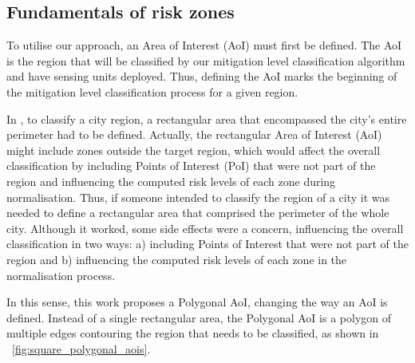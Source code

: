 \begin{refsection}
\section{Fundamentals of risk zones}\label{sec:proposed_approach}


To utilise our approach, an Area of Interest (AoI) must first be defined. The AoI is the region that will be classified by our mitigation level classification algorithm and have sensing units deployed. Thus, defining the AoI marks the beginning of the mitigation level classification process for a given region.

In \cite{riskzones}, to classify a city region, a rectangular area that encompassed the city's entire perimeter had to be defined. Actually, the rectangular Area of Interest (AoI) might include zones outside the target region, which would affect the overall classification by including Points of Interest (PoI) that were not part of the region and influencing the computed risk levels of each zone during normalisation. Thus, if someone intended to classify the region of a city it was needed to define a rectangular area that comprised the perimeter of the whole city. Although it worked, some side effects were a concern, influencing the overall classification in two ways: a) including Points of Interest that were not part of the region and b) influencing the computed risk levels of each zone in the normalisation process.

In this sense, this work proposes a Polygonal AoI, changing the way an AoI is defined. Instead of a single rectangular area, the Polygonal AoI is a polygon of multiple edges contouring the region that needs to be classified, as shown in \figurename~\ref{fig:square_polygonal_aois}.


\end{refsection}

